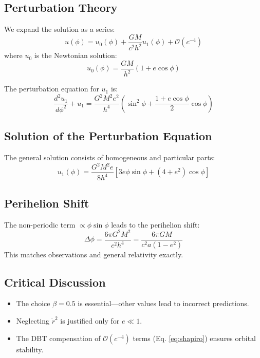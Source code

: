 \subsection{Perturbation Theory}
We expand the solution as a series:
\begin{equation}
u(\phi) = u_0(\phi) + \frac{GM}{c^2h^2}u_1(\phi) + \mathcal{O}(c^{-4})
\end{equation}
where $u_0$ is the Newtonian solution:
\begin{equation}
u_0(\phi) = \frac{GM}{h^2}(1 + e\cos\phi)
\end{equation}

The perturbation equation for $u_1$ is:
\begin{equation}
\frac{d^2u_1}{d\phi^2} + u_1 = \frac{G^2M^2e^2}{h^4}\left(\sin^2\phi + \frac{1 + e\cos\phi}{2}\cos\phi\right)
\end{equation}

\subsection{Solution of the Perturbation Equation}
The general solution consists of homogeneous and particular parts:
\begin{equation}
u_1(\phi) = \frac{G^2M^2e}{8h^4}\left[3e\phi\sin\phi + (4 + e^2)\cos\phi\right]
\end{equation}

\subsection{Perihelion Shift}
The non-periodic term $\propto \phi\sin\phi$ leads to the perihelion shift:
\begin{equation}
\Delta\phi = \frac{6\pi G^2M^2}{c^2h^4} = \frac{6\pi GM}{c^2a(1 - e^2)}
\end{equation}
This matches observations and general relativity exactly.

\subsection{Critical Discussion}
\begin{itemize}
\item The choice $\beta = 0.5$ is essential—other values lead to incorrect predictions.
\item Neglecting $\dot{r}^2$ is justified only for $e \ll 1$.
\item The DBT compensation of $\mathcal{O}(c^{-4})$ terms (Eq. \ref{eq:shapiro}) ensures orbital stability.
\end{itemize}

